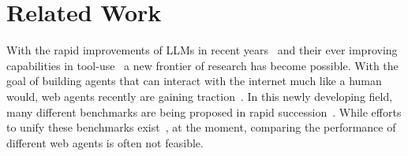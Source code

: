 \section{Related Work}
With the rapid improvements of LLMs in recent years~\cite{dubey2024llama} and their ever improving capabilities in tool-use~\cite{dubey2024llama} a new frontier of research has become possible. With the goal of building agents that can interact with the internet much like a human would, web agents recently are gaining traction~\cite{deng2024mind2web, yao2022webshop}. In this newly developing field, many different benchmarks are being proposed in rapid succession~\cite{yao2022webshop,deng2024mind2web,he2024webvoyagerbuildingendtoendweb}. While efforts to unify these benchmarks exist~\cite{dechezelles2024browsergymecosystemwebagent}, at the moment, comparing the performance of different web agents is often not feasible. 
